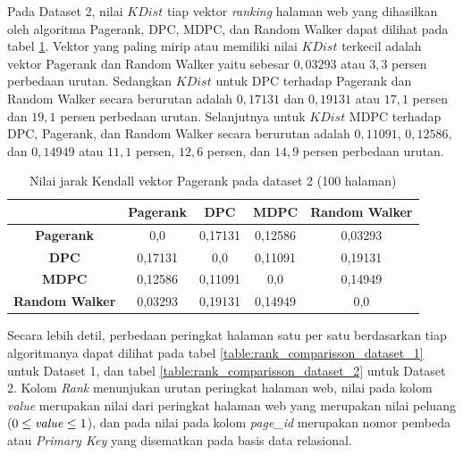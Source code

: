 Pada Dataset 2, nilai $KDist$ tiap vektor \textit{ranking} halaman web yang dihasilkan oleh algoritma Pagerank, DPC, MDPC, dan Random Walker dapat dilihat pada tabel \ref{table:kendall_distance_score_dataset_2}. Vektor yang paling mirip atau memiliki nilai $KDist$ terkecil adalah vektor Pagerank dan Random Walker yaitu sebesar $0,03293$ atau $3,3$ persen perbedaan urutan. Sedangkan $KDist$ untuk DPC terhadap Pagerank dan Random Walker secara berurutan adalah $0,17131$ dan $0,19131$ atau $17,1$ persen dan $19,1$ persen perbedaan urutan. Selanjutnya untuk $KDist$ MDPC terhadap DPC, Pagerank, dan Random Walker secara berurutan adalah $0,11091$, $0,12586$, dan $0,14949$ atau $11,1$ persen, $12,6$ persen, dan $14,9$ persen perbedaan urutan.

\begin{longtable}{|c|c|c|c|c|}
	\caption{Nilai jarak Kendall vektor Pagerank pada dataset 2 (100 halaman)}
	\label{table:kendall_distance_score_dataset_2} \\
	\hline
	& \textbf{Pagerank} & \textbf{DPC} & \textbf{MDPC} & \textbf{Random Walker} \\
	\hline
	\textbf{Pagerank} & 0,0 & 0,17131 & 0,12586 & 0,03293 \\
	\hline
	\textbf{DPC} & 0,17131 & 0,0 & 0,11091 & 0,19131 \\
	\hline
	\textbf{MDPC} & 0,12586 & 0,11091 & 0,0 & 0,14949 \\
	\hline
	\textbf{Random Walker} & 0,03293 & 0,19131 & 0,14949 & 0,0 \\
	\hline
\end{longtable}

Secara lebih detil, perbedaan peringkat halaman satu per satu berdasarkan tiap algoritmanya dapat dilihat pada tabel \ref{table:rank_comparisson_dataset_1} untuk Dataset 1, dan tabel \ref{table:rank_comparisson_dataset_2} untuk Dataset 2. Kolom \textit{Rank} menunjukan urutan peringkat halaman web, nilai pada kolom \textit{value} merupakan nilai dari peringkat halaman web yang merupakan nilai peluang ($0 \leq \text{\textit{value}} \leq 1$), dan pada nilai pada kolom \textit{page\_id} merupakan nomor pembeda atau \textit{Primary Key} yang disematkan pada basis data relasional.

